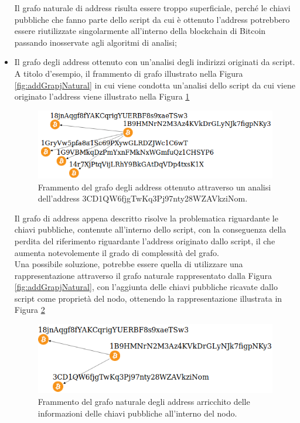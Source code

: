 \begin{itemize}
   Il grafo naturale di address risulta essere troppo superficiale, perché le chiavi pubbliche che fanno parte dello script da cui è ottenuto l'address  potrebbero essere riutilizzate singolarmente all'interno della blockchain di Bitcoin passando inosservate agli algoritmi di analisi;
   \item Il grafo degli address ottenuto con un'analisi degli indirizzi originati da script. A titolo d'esempio, il frammento di grafo illustrato nella Figura \ref{fig:addGrapjNatural} in cui viene condotta un'analisi dello script da cui viene originato l'address  viene illustrato nella Figura \ref{fig:addGraphAnalisis}
   \begin{figure}[H]
   \centering
   \includegraphics[scale=0.35]{images/exampleWithGraph/decode-address-graph-scam.png}
   \caption{Frammento del grafo degli address ottenuto attraverso un analisi dell'address 3CD1\-QW6fjg\-TwKq3Pj\-97nty28W\-ZAVkz\-iNom.\label{fig:addGraphAnalisis}}
   \end{figure}
   Il grafo di address appena descritto risolve la problematica riguardante le chiavi pubbliche, contenute all'interno dello script, con la conseguenza della perdita del riferimento riguardante l'address originato dallo script, il che aumenta notevolemente il grado di complessità del grafo.\\
   Una possibile soluzione, potrebbe essere quella di utilizzare una rappresentazione attraverso il grafo naturale rappresentato dalla Figura \ref{fig:addGrapjNatural}, con l'aggiunta delle chiavi pubbliche ricavate dallo script come proprietà del nodo, ottenendo la rappresentazione illustrata in Figura \ref{fig:addGrapjNaturalPlus}
   \begin{figure}[H]
   \centering
   \includegraphics[scale=0.35]{images/exampleWithGraph/naturalAddressGrahScamTx.png}
   \caption{Frammento del grafo naturale degli address arricchito delle informazioni delle chiavi pubbliche all'interno del nodo.\label{fig:addGrapjNaturalPlus}}
   \end{figure}
 \end{itemize}

